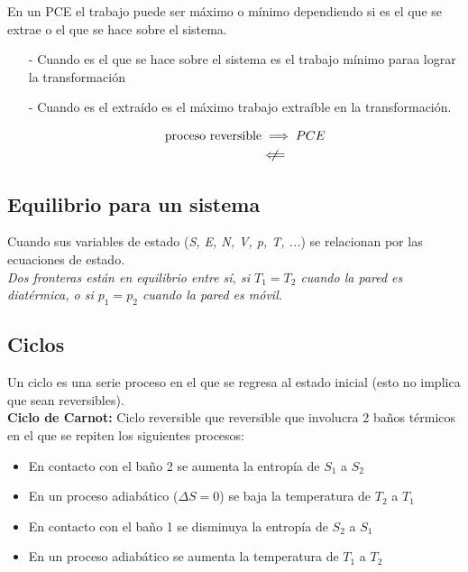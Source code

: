 En un PCE el trabajo puede ser máximo o mínimo dependiendo si es el que se extrae o el que se hace sobre el sistema.

\begin{itemize}
    \item[-] Cuando es el que se hace sobre el sistema es el trabajo mínimo paraa lograr la transformación
    \item[-] Cuando es el extraído es el máximo trabajo extraíble en la transformación. 
    
    \begin{equation}
    \begin{split}
        \text{proceso reversible} &\implies PCE\\
        &\centernot\Longleftarrow
    \end{split}
    \nonumber
\end{equation}
\end{itemize}

\subsection{Equilibrio para un sistema} Cuando sus variables de estado (\textit{S, E, N, V, p, T, ...}) se relacionan por las ecuaciones de estado.\\

\textit{Dos fronteras están en equilibrio entre sí, si $T_1 = T_2$ cuando la pared es diatérmica, o si $p_1 = p_2$ cuando la pared es móvil.}

\subsection{Ciclos}
\label{ciclos}
Un ciclo es una serie proceso en el que se regresa al estado inicial (esto no implica que sean reversibles).\\

\textbf{Ciclo de Carnot:} Ciclo reversible que reversible que involucra 2 baños térmicos en el que se repiten los siguientes procesos:

\begin{itemize}
    \item En contacto con el baño 2 se aumenta la entropía de $S_1$ a $S_2$
    \item En un proceso adiabático ($\Delta S=0$) se baja la temperatura de $T_2$ a $T_1$
    \item En contacto con el baño 1 se disminuya la entropía de $S_2$ a $S_1$
    \item En un proceso adiabático se aumenta la temperatura de $T_1$ a $T_2$
\end{itemize}

